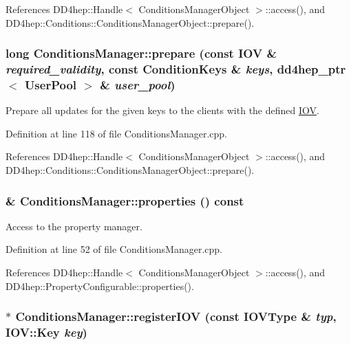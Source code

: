 References DD4hep::Handle$<$ ConditionsManagerObject $>$::access(), and DD4hep::Conditions::ConditionsManagerObject::prepare().\hypertarget{class_d_d4hep_1_1_conditions_1_1_conditions_manager_a3f702bb3db03a4e7b947e8ed591f138b}{
\subsubsection[{prepare}]{\setlength{\rightskip}{0pt plus 5cm}long ConditionsManager::prepare (const {\bf IOV} \& {\em required\_\-validity}, \/  const {\bf ConditionKeys} \& {\em keys}, \/  {\bf dd4hep\_\-ptr}$<$ {\bf UserPool} $>$ \& {\em user\_\-pool})}}
\label{class_d_d4hep_1_1_conditions_1_1_conditions_manager_a3f702bb3db03a4e7b947e8ed591f138b}


Prepare all updates for the given keys to the clients with the defined \hyperlink{class_d_d4hep_1_1_i_o_v}{IOV}. 

Definition at line 118 of file ConditionsManager.cpp.

References DD4hep::Handle$<$ ConditionsManagerObject $>$::access(), and DD4hep::Conditions::ConditionsManagerObject::prepare().\hypertarget{class_d_d4hep_1_1_conditions_1_1_conditions_manager_accf8571c5f7f183a6749539b87d489cd}{
\subsubsection[{properties}]{ \& ConditionsManager::properties () const}}
\label{class_d_d4hep_1_1_conditions_1_1_conditions_manager_accf8571c5f7f183a6749539b87d489cd}


Access to the property manager. 

Definition at line 52 of file ConditionsManager.cpp.

References DD4hep::Handle$<$ ConditionsManagerObject $>$::access(), and DD4hep::PropertyConfigurable::properties().\hypertarget{class_d_d4hep_1_1_conditions_1_1_conditions_manager_a5be8e5c4facef3b9658b6e270c37c1b7}{
\subsubsection[{registerIOV}]{ $\ast$ ConditionsManager::registerIOV (const {\bf IOVType} \& {\em typ}, \/  {\bf IOV::Key} {\em key})}}
\label{class_d_d4hep_1_1_conditions_1_1_conditions_manager_a5be8e5c4facef3b9658b6e270c37c1b7}


